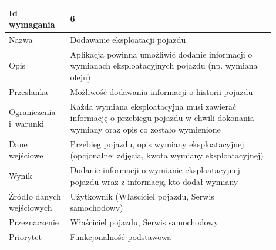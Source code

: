 \documentclass[12pt]{article}
\begin{document}
\begin{table}[H]
\begin{center}
	\begin{tabular}{|p{0.18\linewidth}|p{0.72\linewidth}|}%
	\hline
	Id wymagania 	& 6 				\\ \hline
	Nazwa			& Dodawanie eksploatacji pojazdu \\ \hline
	Opis &	 Aplikacja powinna umożliwić dodanie informacji o wymianach eksploatacyjnych pojazdu (np. wymiana oleju)\\ \hline
	Przesłanka & Możliwość dodawania informacji o historii pojazdu  \\ \hline
	Ograniczenia i~warunki & Każda wymiana eksploatacyjna musi zawierać informację o przebiegu pojazdu w chwili dokonania wymiany oraz opis co zostało wymienione \\ \hline
	Dane wejściowe &Przebieg pojazdu, opis wymiany eksploatacyjnej
(opcjonalne: zdjęcia, kwota wymiany eksploatacyjnej) \\ \hline
	Wynik & Dodanie informacji o wymianie eksploatacyjnej pojazdu wraz z informacją kto dodał wymiany\\ \hline
	Źródło danych wejściowych &Użytkownik (Właściciel pojazdu, Serwis samochodowy)\\ \hline	Przeznaczenie & Właściciel pojazdu, Serwis samochodowy\\ \hline
	Priorytet & Funkcjonalność podstawowa \\ \hline
	\end{tabular}
\end{center}
\end{table}
\end{document}
